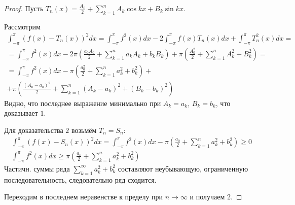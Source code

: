 \documentclass{article}
\begin{document}
\begin{proof}
  Пусть $T_n(x)=\frac{A_0}{2}+\sum_{k=1}^{n}A_k\cos kx + B_k\sin kx$.

  Рассмотрим
  \begin{gather*}
    \int_{-\pi}^{\pi}(f(x)-T_n(x))^{2}dx=\int_{-\pi}^{\pi}f^{2}(x)dx - 2\int_{-\pi}^{\pi}f(x)T_n(x)dx+\int_{-\pi}^{\pi}T_n^{2}(x)dx = \\ 
    = \int_{-\pi}^{\pi} f^{2}(x)dx -2\pi (\frac{a_0A_0}{2}+\sum_{k=1}^{n}a_kA_k+b_kB_k)+\pi(\frac{A_0^{2}}{2}+\sum_{k=1}^{n}A_k^{2}+B_k^{2})= \\ 
    = \int_{-\pi}^{\pi}f^{2}(x)dx-\pi\left(\frac{a_0^{2}}{2}+\sum_{k=1}^{n}a_k^{2}+b_k^{2}\right) +\\
    +\pi\left(\frac{(A_0-a_0)^{2}}{2}+\sum_{k=1}^{n}(A_k-a_k)^{2}+(B_k-b_k)^{2}\right)
  \end{gather*}
  Видно, что последнее выражение минимально при $A_k=a_k$, $B_k=b_k$,
  что доказывает $1$.

  Для доказательства $2$ возьмём $T_n=S_n$:
  \begin{gather*}
    \int_{-\pi}^{\pi}(f(x)-S_n(x))^{2}dx=\int_{-\pi}^{\pi}f^{2}(x)dx-\pi\left(\frac{a_0}{2}+\sum_{k=1}^{n}a_k^{2}+b_k^{2}\right) \ge 0\\
    \int_{-\pi}^{\pi}f^{2}(x)dx \ge \pi\left(\frac{a_0}{2}+\sum_{k=1}^{n}a_k^{2}+b_k^{2}\right)
  \end{gather*}
  Частичн. суммы ряда $\sum_{k=1}^{\infty}a_k^{2}+b_k^{2}$ составляют неубывающую,
  ограниченную последовательность, следовательно ряд сходится.

  Переходим в последнем неравенстве к пределу при $n\to\infty$ и получаем 2.
\end{proof}

\end{document}
